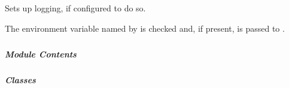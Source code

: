 \documentclass[letterpaper,10pt,english]{sphinxmanual}
\begin{document}

\begin{fulllineitems}
\label{\detokenize{autoapi/pine/client/log/index:pine.client.log.setup_logging}}
\sphinxAtStartPar
Sets up logging, if configured to do so.

\sphinxAtStartPar
The environment variable named by {\hyperref[\detokenize{autoapi/pine/client/log/index:pine.client.log.CONFIG_FILE_ENV}]{}} is checked and, if present, is
passed to .

\end{fulllineitems}



\subparagraph{}
\label{\detokenize{autoapi/pine/client/models/index:module-pine.client.models}}\label{\detokenize{autoapi/pine/client/models/index:pine-client-models}}\label{\detokenize{autoapi/pine/client/models/index::doc}}

\subparagraph{Module Contents}
\label{\detokenize{autoapi/pine/client/models/index:module-contents}}

\subparagraph{Classes}
\label{\detokenize{autoapi/pine/client/models/index:classes}}
\end{document}
